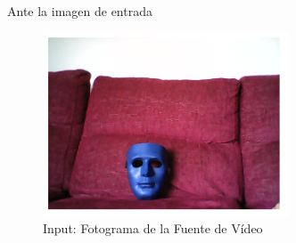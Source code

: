 \begin{center}
Ante la imagen de entrada
\end{center}
\begin{figure}[!hbtp]  \centering\noindent
    \includegraphics[width=0.65\textwidth]{figures/cf_input.png}
    \caption{Input: Fotograma de la Fuente de Vídeo}
    \label{input}
\end{figure}

